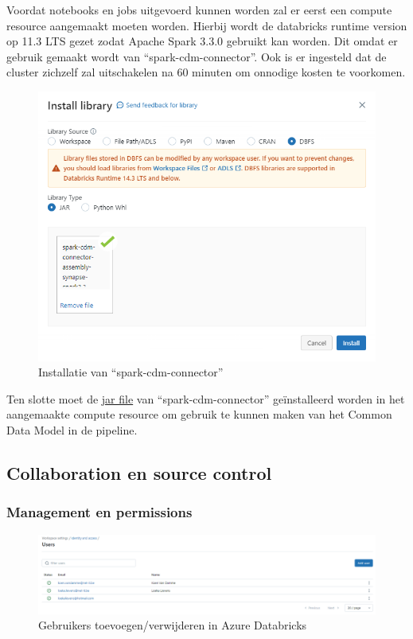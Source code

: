 Voordat notebooks en jobs uitgevoerd kunnen worden zal er eerst een compute resource aangemaakt moeten worden. Hierbij wordt de databricks runtime version op 11.3 LTS gezet zodat Apache Spark 3.3.0 gebruikt kan worden. Dit omdat er gebruik gemaakt wordt van ``spark-cdm-connector''. Ook is er ingesteld dat de cluster zichzelf zal uitschakelen na 60 minuten om onnodige kosten te voorkomen.

\begin{figure}[H]
    \centering
    \includegraphics[width=1\textwidth]{./graphics/databricks/initial_6.png}
    \caption{Installatie van ``spark-cdm-connector''}
\end{figure}

Ten slotte moet de \href{https://github.com/Azure/spark-cdm-connector/releases/tag/spark3.3-1.19.5}{jar file} van ``spark-cdm-connector'' geïnstalleerd worden in het aangemaakte compute resource om gebruik te kunnen maken van het Common Data Model in de pipeline.

\subsection{Collaboration en source control}

\subsubsection{Management en permissions}

\begin{figure}[H]
    \centering
    \includegraphics[width=1\textwidth]{./graphics/databricks/management_permissions_1.png}
    \caption{Gebruikers toevoegen/verwijderen in Azure Databricks}
\end{figure}

